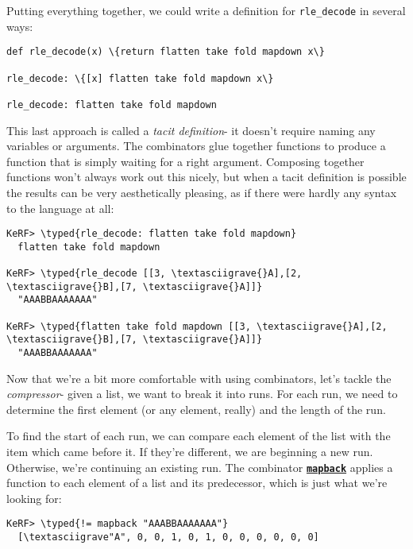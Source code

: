 \documentclass{article}
\newcommand{\typed}[1]{\textcolor{TealBlue}{#1}}
\newcommand{\primu}[2]{\hyperref[prim:#2]{\textbf{\texttt{#1}}}}
\newcommand{\comb}[1]{\primu{#1}{#1}}
\begin{document}
Putting everything together, we could write a definition for \texttt{rle\_decode} in several ways:
\begin{Verbatim}
def rle_decode(x) \{return flatten take fold mapdown x\}

rle_decode: \{[x] flatten take fold mapdown x\}

rle_decode: flatten take fold mapdown
\end{Verbatim}

This last approach is called a \emph{tacit definition}- it doesn't require naming any variables or arguments. The combinators glue together functions to produce a function that is simply waiting for a right argument. Composing together functions won't always work out this nicely, but when a tacit definition is possible the results can be very aesthetically pleasing, as if there were hardly any syntax to the language at all:

\begin{Verbatim}
KeRF> \typed{rle_decode: flatten take fold mapdown}
  flatten take fold mapdown

KeRF> \typed{rle_decode [[3, \textasciigrave{}A],[2, \textasciigrave{}B],[7, \textasciigrave{}A]]}
  "AAABBAAAAAAA"

KeRF> \typed{flatten take fold mapdown [[3, \textasciigrave{}A],[2, \textasciigrave{}B],[7, \textasciigrave{}A]]}
  "AAABBAAAAAAA"
\end{Verbatim}

Now that we're a bit more comfortable with using combinators, let's tackle the \emph{compressor}- given a list, we want to break it into runs. For each run, we need to determine the first element (or any element, really) and the length of the run.

\vspace{0.5cm}

To find the start of each run, we can compare each element of the list with the item which came before it. If they're different, we are beginning a new run. Otherwise, we're continuing an existing run. The combinator \comb{mapback} applies a function to each element of a list and its predecessor, which is just what we're looking for:
\begin{Verbatim}
KeRF> \typed{!= mapback "AAABBAAAAAAA"}
  [\textasciigrave"A", 0, 0, 1, 0, 1, 0, 0, 0, 0, 0, 0]
\end{Verbatim}
\end{document}
